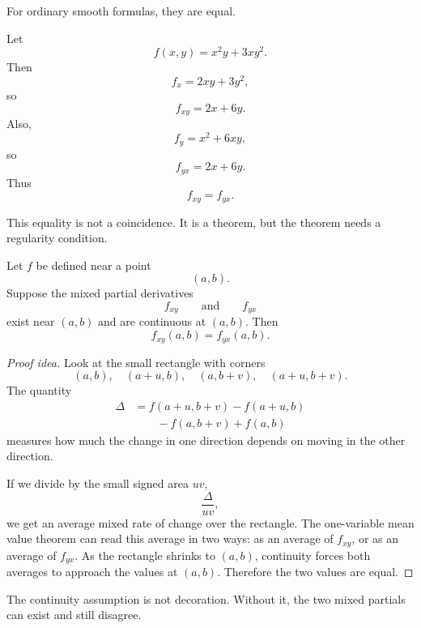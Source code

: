 For ordinary smooth formulas, they are equal.

\begin{example}
Let
\[
    f(x,y)=x^2y+3xy^2.
\]
Then
\[
    f_x=2xy+3y^2,
\]
so
\[
    f_{xy}=2x+6y.
\]
Also,
\[
    f_y=x^2+6xy,
\]
so
\[
    f_{yx}=2x+6y.
\]
Thus
\[
    f_{xy}=f_{yx}.
\]
\end{example}

This equality is not a coincidence.  It is a theorem, but the theorem needs a regularity
condition.

\begin{theorem}
Let \(f\) be defined near a point
\[
    (a,b).
\]
Suppose the mixed partial derivatives
\[
    f_{xy}
    \qquad\text{and}\qquad
    f_{yx}
\]
exist near \((a,b)\) and are continuous at \((a,b)\).  Then
\[
\boxed{
    f_{xy}(a,b)=f_{yx}(a,b).
}
\]
\end{theorem}

\begin{proof}[Proof idea]
Look at the small rectangle with corners
\[
    (a,b),\quad (a+u,b),\quad (a,b+v),\quad (a+u,b+v).
\]
The quantity
\[
\begin{aligned}
    \Delta
    &=
    f(a+u,b+v)-f(a+u,b)\\
    &\qquad
    -f(a,b+v)+f(a,b)
\end{aligned}
\]
measures how much the change in one direction depends on moving in the other
direction.

If we divide by the small signed area \(uv\),
\[
    \frac{\Delta}{uv},
\]
we get an average mixed rate of change over the rectangle.  The one-variable mean
value theorem can read this average in two ways: as an average of \(f_{xy}\), or as an
average of \(f_{yx}\).  As the rectangle shrinks to \((a,b)\), continuity forces both
averages to approach the values at \((a,b)\).  Therefore the two values are equal.
\end{proof}

The continuity assumption is not decoration.  Without it, the two mixed partials can
exist and still disagree.

